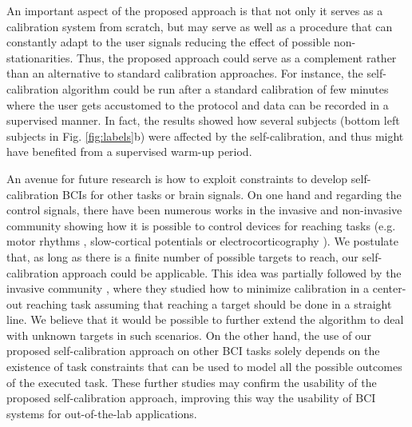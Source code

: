 An important aspect of the proposed approach is that not only it serves as a calibration system from scratch, but may serve as well as a procedure that can constantly adapt to the user signals reducing the effect of possible non-stationarities. Thus, the proposed approach could serve as a complement rather than an alternative to standard calibration approaches. For instance, the self-calibration algorithm could be run after a standard calibration of few minutes where the user gets accustomed to the protocol and data can be recorded in a supervised manner. In fact, the results showed how several subjects (bottom left subjects in Fig. \ref{fig:labels}b) were affected by the self-calibration, and thus might have benefited from a supervised warm-up period.

An avenue for future research is how to exploit constraints to develop self-calibration BCIs for other tasks or brain signals. 	On one hand and regarding the control signals, there have been numerous works in the invasive and non-invasive community showing how it is possible to control devices for reaching tasks (e.g. motor rhythms \cite{mcfarland2010electroencephalographic}, slow-cortical potentials \cite{birbaumer1999spelling} or electrocorticography \cite{schalk2008two}). We postulate that, as long as there is a finite number of possible targets to reach, our self-calibration approach could be applicable. This idea was partially followed by the invasive community \cite{Orsborn12, orsborn2014closed}, where they studied how to minimize calibration in a center-out reaching task assuming that reaching a target should be done in a straight line. We believe that it would be possible to further extend the algorithm to deal with unknown targets in such scenarios.
%
On the other hand, the use of our proposed self-calibration approach on other BCI tasks solely depends on the existence of task constraints that can be used to model all the possible outcomes of the executed task.
%
These further studies may confirm the usability of the proposed self-calibration approach, improving this way the usability of BCI systems for out-of-the-lab applications.

